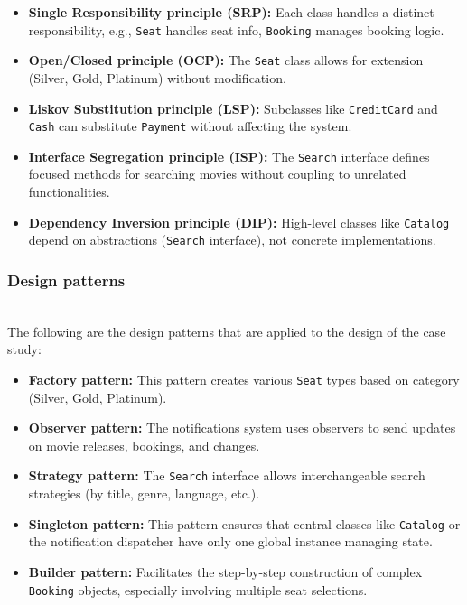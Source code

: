 \begin{itemize}
\item
\protect{}\label{jGzR0SBylT6O9fMuQh0HC}
\textbf{Single Responsibility principle (SRP):} Each class handles a distinct responsibility, e.g., \texttt{Seat} handles seat info, \texttt{Booking} manages booking logic.
\item
\protect{}\label{fMx9JyICv3iupsY7MspFH}
\textbf{Open/Closed principle (OCP):} The \texttt{Seat} class allows for extension (Silver, Gold, Platinum) without modification.
\item
\protect{}\label{Xy8vDp3TiZ4VKtlmwSbYH}
\textbf{Liskov Substitution principle (LSP):} Subclasses like \texttt{CreditCard} and \texttt{Cash} can substitute \texttt{Payment} without affecting the system.
\item
\protect{}\label{SZ5ylfnTi23RQxdAt2NVu}
\textbf{Interface Segregation principle (ISP):} The \texttt{Search} interface defines focused methods for searching movies without coupling to unrelated functionalities.
\item
\protect{}\label{KrkQAqYHnYPtS6cyQfHqW}
\textbf{Dependency Inversion principle (DIP):} High-level classes like \texttt{Catalog} depend on abstractions (\texttt{Search} interface), not concrete implementations.
\end{itemize}

\subsubsection{Design patterns}\label{mZFrQ-AbUDI8wDa72LN0t}
\\
The following are the design patterns that are applied to the design of the case study:

\begin{itemize}
\item
\protect{}\label{0tFHR3Didtokdr-9lm6v8}
\textbf{Factory pattern:} This pattern creates various \texttt{Seat} types based on category (Silver, Gold, Platinum).
\item
\protect{}\label{f_5dduth8_QK2av_HVagq}
\textbf{Observer pattern:} The notifications system uses observers to send updates on movie releases, bookings, and changes.
\item
\protect{}\label{YM6qeg5MdBnYlRn7TJ-to}
\textbf{Strategy pattern:} The \texttt{Search} interface allows interchangeable search strategies (by title, genre, language, etc.).
\item
\protect{}\label{5UZ2gfHuBIuf0Gjc1s9FD}
\textbf{Singleton pattern:} This pattern ensures that central classes like \texttt{Catalog} or the notification dispatcher have only one global instance managing state.
\item
\protect{}\label{NY-Ly8KlIkG6kSkxJQ9_Z}
\textbf{Builder pattern:} Facilitates the step-by-step construction of complex \texttt{Booking} objects, especially involving multiple seat selections.
\end{itemize}

